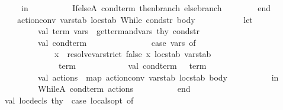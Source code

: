 \begin{isabellebody}
\ \ \ \ \ \ \ \ in\isanewline
\ \ \ \ \ \ \ \ \ \ IfelseA\ {\isacharparenleft}{\kern0pt}{\isacharparenleft}{\kern0pt}cond{\isacharunderscore}{\kern0pt}term{\isacharcomma}{\kern0pt}\ then{\isacharunderscore}{\kern0pt}branch{\isacharprime}{\kern0pt}{\isacharparenright}{\kern0pt}{\isacharcomma}{\kern0pt}\ else{\isacharunderscore}{\kern0pt}branch{\isacharprime}{\kern0pt}{\isacharparenright}{\kern0pt}\isanewline
\ \ \ \ \ \ \ \ end\isanewline
\isanewline
\ \ \ \ \ \ {\isacharbar}{\kern0pt}\ action{\isacharunderscore}{\kern0pt}conv\ varstab\ locstab\ {\isacharparenleft}{\kern0pt}While\ {\isacharparenleft}{\kern0pt}cond{\isacharunderscore}{\kern0pt}str{\isacharcomma}{\kern0pt}\ body{\isacharparenright}{\kern0pt}{\isacharparenright}{\kern0pt}\ {\isacharequal}{\kern0pt}\isanewline
\ \ \ \ \ \ \ \ \ \ let\isanewline
\ \ \ \ \ \ \ \ \ \ \ \ val\ {\isacharparenleft}{\kern0pt}term{\isacharcomma}{\kern0pt}\ vars{\isacharparenright}{\kern0pt}\ {\isacharequal}{\kern0pt}\ get{\isacharunderscore}{\kern0pt}term{\isacharunderscore}{\kern0pt}and{\isacharunderscore}{\kern0pt}vars\ thy\ cond{\isacharunderscore}{\kern0pt}str\isanewline
\ \ \ \ \ \ \ \ \ \ \ {\isacharparenleft}{\kern0pt}{\isacharasterisk}{\kern0pt}\ val\ cond{\isacharunderscore}{\kern0pt}term\ {\isacharequal}{\kern0pt}\isanewline
\ \ \ \ \ \ \ \ \ \ \ \ \ \ case\ vars\ of\isanewline
\ \ \ \ \ \ \ \ \ \ \ \ \ \ \ \ {\isacharbrackleft}{\kern0pt}x{\isacharbrackright}{\kern0pt}\ {\isacharequal}{\kern0pt}{\isachargreater}{\kern0pt}\ resolve{\isacharunderscore}{\kern0pt}var{\isacharunderscore}{\kern0pt}strict\ false\ x\ locstab\ varstab\isanewline
\ \ \ \ \ \ \ \ \ \ \ \ \ \ {\isacharbar}{\kern0pt}\ {\isacharunderscore}{\kern0pt}\ {\isacharequal}{\kern0pt}{\isachargreater}{\kern0pt}\ term{\isacharasterisk}{\kern0pt}{\isacharparenright}{\kern0pt}\isanewline
\ \ \ \ \ \ \ \ \ \ \ \ val\ cond{\isacharunderscore}{\kern0pt}term\ {\isacharequal}{\kern0pt}\ \ term\ \ \isanewline
\ \ \ \ \ \ \ \ \ \ \ \ val\ actions\ {\isacharequal}{\kern0pt}\ map\ {\isacharparenleft}{\kern0pt}action{\isacharunderscore}{\kern0pt}conv\ varstab\ locstab{\isacharparenright}{\kern0pt}\ body\isanewline
\ \ \ \ \ \ \ \ \ \ in\isanewline
\ \ \ \ \ \ \ \ \ \ \ \ WhileA\ {\isacharparenleft}{\kern0pt}cond{\isacharunderscore}{\kern0pt}term{\isacharcomma}{\kern0pt}\ actions{\isacharparenright}{\kern0pt}\isanewline
\ \ \ \ \ \ \ \ \ \ end\isanewline
\isanewline
\ \ \ \ val\ {\isacharparenleft}{\kern0pt}loc{\isacharunderscore}{\kern0pt}decls{\isacharprime}{\kern0pt}{\isacharcomma}{\kern0pt}\ thy{}{\isacharprime}{\kern0pt}{\isacharparenright}{\kern0pt}\ {\isacharequal}{\kern0pt}\ case\ locals{\isacharunderscore}{\kern0pt}opt\ of\isanewline

\end{isabellebody}
